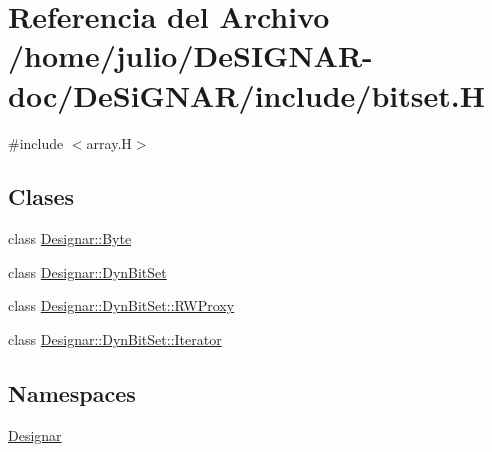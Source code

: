 \hypertarget{bitset_8_h}{}\section{Referencia del Archivo /home/julio/\+De\+S\+I\+G\+N\+A\+R-\/doc/\+De\+Si\+G\+N\+A\+R/include/bitset.H}
\label{bitset_8_h}
{\ttfamily \#include $<$array.\+H$>$}\newline
\subsection*{Clases}
\begin{DoxyCompactItemize}
\item 
class \hyperlink{class_designar_1_1_byte}{Designar\+::\+Byte}
\item 
class \hyperlink{class_designar_1_1_dyn_bit_set}{Designar\+::\+Dyn\+Bit\+Set}
\item 
class \hyperlink{class_designar_1_1_dyn_bit_set_1_1_r_w_proxy}{Designar\+::\+Dyn\+Bit\+Set\+::\+R\+W\+Proxy}
\item 
class \hyperlink{class_designar_1_1_dyn_bit_set_1_1_iterator}{Designar\+::\+Dyn\+Bit\+Set\+::\+Iterator}
\end{DoxyCompactItemize}
\subsection*{Namespaces}
\begin{DoxyCompactItemize}
\item 
 \hyperlink{namespace_designar}{Designar}
\end{DoxyCompactItemize}
